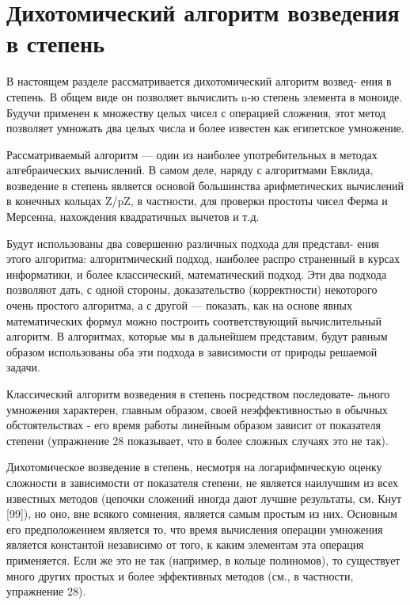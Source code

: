\pagebreak
\section{Дихотомический алгоритм возведения в степень}
\noindent В настоящем разделе рассматривается дихотомический алгоритм воз­вед-
ения в степень. В общем виде он позволяет вычислить n-ю степень 
элемента в моноиде. Будучи применен к множеству целых чисел с опе­рацией
 сложения, этот метод позволяет умножать два целых  числа и 
более известен как египетское умножение.

Рассматриваемый алгоритм — один из наиболее употребительных 
в  методах алгебраических вычислений.  В  самом деле,  наряду с  алго­ритмами Евклида, возведение в степень является основой большинства 
арифметических  вычислений  в  конечных кольцах Z/pZ, в частности, 
для проверки простоты чисел Ферма и Мерсенна, нахождения квадра­тичных вычетов и т.д.

Будут использованы два совершенно различных подхода для пред­ставл-
ения этого алгоритма: алгоритмический подход, наиболее распро­
страненный  в курсах информатики,  и более классический,  математи­ческий подход. Эти два подхода позволяют дать, с одной стороны, до­казательство (корректности)  некоторого очень простого алгоритма, а 
с  другой  —  показать,  как  на основе явных математических  формул 
можно построить соответствующий вычислительный алгоритм. В ал­горитмах, которые мы в дальнейшем представим, будут равным обра­зом использованы оба эти подхода в зависимости от природы решаемой 
задачи.

Классический алгоритм возведения в степень посредством последо­вате-
льного умножения характерен,  главным образом, своей  неэффек­тивностью в обычных обстоятельствах - его время работы линейным 
образом зависит  от  показателя  степени  (упражнение  28  показывает, 
что в более сложных случаях это не так).

Дихотомическое  возведение  в степень,  несмотря  на логарифмиче­скую оценку сложности в зависимости от показателя степени, не явля­ется наилучшим из всех известных методов (цепочки сложений иногда 
дают лучшие результаты, см. Кнут [99]), но оно, вне всякого сомнения, 
является самым простым из них. Основным его предположением явля­ется то, что время вычисления операции умножения является констан­той независимо от того, к каким элементам эта операция применяется. 
Если  же  это  не  так  (например,  в  кольце  полиномов),  то  существует 
много других простых и более эффективных  методов (см.,  в частно­сти, упражнение 28).
